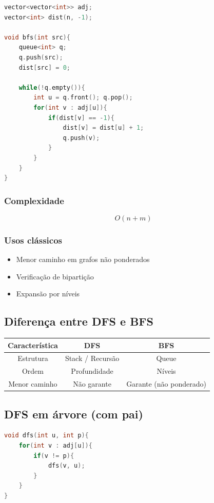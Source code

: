 \documentclass[11pt]{article}
\begin{document}
\begin{lstlisting}[language=C++]
vector<vector<int>> adj;
vector<int> dist(n, -1);

void bfs(int src){
    queue<int> q;
    q.push(src);
    dist[src] = 0;

    while(!q.empty()){
        int u = q.front(); q.pop();
        for(int v : adj[u]){
            if(dist[v] == -1){
                dist[v] = dist[u] + 1;
                q.push(v);
            }
        }
    }
}
\end{lstlisting}

\subsubsection{Complexidade}

\[
O(n + m)
\]

\subsubsection{Usos clássicos}

\begin{itemize}
    \item Menor caminho em grafos não ponderados
    \item Verificação de bipartição
    \item Expansão por níveis
\end{itemize}

\subsection{Diferença entre DFS e BFS}

\begin{center}
\begin{tabular}{|c|c|c|}
\hline
Característica & DFS & BFS \\
\hline
Estrutura & Stack / Recursão & Queue \\
Ordem & Profundidade & Níveis \\
Menor caminho & Não garante & Garante (não ponderado) \\
\hline
\end{tabular}
\end{center}

\subsection{DFS em árvore (com pai)}

\begin{lstlisting}[language=C++]
void dfs(int u, int p){
    for(int v : adj[u]){
        if(v != p){
            dfs(v, u);
        }
    }
}
\end{lstlisting}
\end{document}
